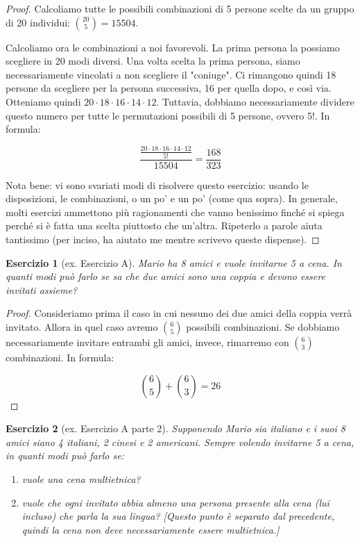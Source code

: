\documentclass[12pt]{article}
\newtheorem{theorem}{Esercizio}
\begin{document}
\begin{proof}
Calcoliamo tutte le possibili combinazioni di 5 persone scelte da un gruppo di 20 individui: ${20 \choose 5} = 15504$.

Calcoliamo ora le combinazioni a noi favorevoli. La prima persona la possiamo scegliere in 20 modi diversi. Una volta scelta la prima persona, siamo necessariamente vincolati a non scegliere il "coniuge". Ci rimangono quindi 18 persone da scegliere per la persona successiva, 16 per quella dopo, e così via. Otteniamo quindi $20 \cdot 18 \cdot 16 \cdot 14 \cdot 12$. Tuttavia, dobbiamo necessariamente dividere questo numero per tutte le permutazioni possibili di 5 persone, ovvero 5!. In formula:

$$\frac{\frac{20 \cdot 18 \cdot 16 \cdot 14 \cdot 12}{5!}}{ 15504} = \frac{168}{323}$$

Nota bene: vi sono svariati modi di risolvere questo esercizio: usando le disposizioni, le combinazioni, o un po' e un po' (come qua sopra). In generale, molti esercizi ammettono più ragionamenti che vanno benissimo finché si spiega perché si è fatta una scelta piuttosto che un'altra. Ripeterlo a parole aiuta tantissimo (per inciso, ha aiutato me mentre scrivevo queste dispense). 
\end{proof}

\begin{theorem}[ex. Esercizio A]
Mario ha 8 amici e vuole invitarne 5 a cena. In quanti modi può farlo se sa che due amici sono una coppia e devono essere invitati assieme? 
\end{theorem}

\begin{proof}
Consideriamo prima il caso in cui nessuno dei due amici della coppia verrà invitato. Allora in quel caso avremo ${6 \choose 5}$ possibili combinazioni. Se dobbiamo necessariamente invitare entrambi gli amici, invece, rimarremo con ${6 \choose 3}$ combinazioni. In formula:

$${6 \choose 5} + {6 \choose 3} = 26$$

\end{proof}

\begin{theorem}[ex. Esercizio A parte 2]
Supponendo Mario sia italiano e i suoi 8 amici siano 4 italiani, 2 cinesi e 2 americani. Sempre volendo invitarne 5 a cena, in quanti modi può farlo se:
\begin{enumerate}
    \item vuole una cena multietnica?
    \item vuole che ogni invitato abbia almeno una persona presente alla cena (lui incluso) che parla la sua lingua? [Questo punto è separato dal precedente, quindi la cena non deve necessariamente essere multietnica.]
\end{enumerate}
\end{theorem}
\end{document}
